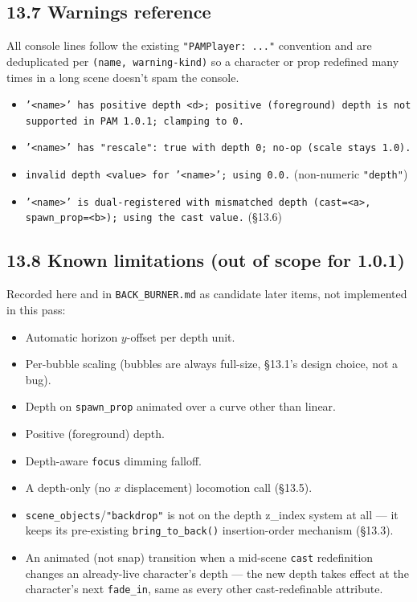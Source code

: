 \documentclass[
  12pt,
  letterpaper,
]{book}
\begin{document}
\subsection{\texorpdfstring{13.7 Warnings reference}{13.7 Warnings reference}}\label{depth-warnings-reference}

All console lines follow the existing \texttt{"PAMPlayer: ..."}
convention and are deduplicated per \texttt{(name, warning-kind)} so a
character or prop redefined many times in a long scene doesn't spam
the console.

\begin{itemize}
\item
  \texttt{'<name>' has positive depth <d>; positive (foreground) depth
  is not supported in PAM 1.0.1; clamping to 0.}
\item
  \texttt{'<name>' has "rescale": true with depth 0; no-op (scale
  stays 1.0).}
\item
  \texttt{invalid depth <value> for '<name>'; using 0.0.} (non-numeric
  \texttt{"depth"})
\item
  \texttt{'<name>' is dual-registered with mismatched depth
  (cast=<a>, spawn\_prop=<b>); using the cast value.} (\S13.6)
\end{itemize}

\subsection{\texorpdfstring{13.8 Known limitations (out of scope for 1.0.1)}{13.8 Known limitations}}\label{depth-out-of-scope}

Recorded here and in \texttt{BACK\_BURNER.md} as candidate later
items, not implemented in this pass:

\begin{itemize}
\item
  Automatic horizon $y$-offset per depth unit.
\item
  Per-bubble scaling (bubbles are always full-size, \S13.1's design
  choice, not a bug).
\item
  Depth on \texttt{spawn\_prop} animated over a curve other than
  linear.
\item
  Positive (foreground) depth.
\item
  Depth-aware \texttt{focus} dimming falloff.
\item
  A depth-only (no $x$ displacement) locomotion call (\S13.5).
\item
  \texttt{scene\_objects}/\texttt{"backdrop"} is not on the depth
  z\_index system at all --- it keeps its pre-existing
  \texttt{bring\_to\_back()} insertion-order mechanism (\S13.3).
\item
  An animated (not snap) transition when a mid-scene \texttt{cast}
  redefinition changes an already-live character's depth --- the new
  depth takes effect at the character's next \texttt{fade\_in}, same
  as every other cast-redefinable attribute.
\end{itemize}
\end{document}
